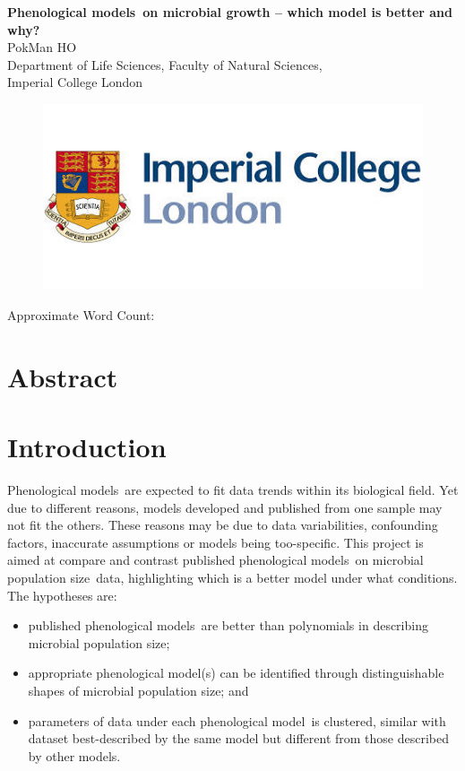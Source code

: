 \documentclass[a4paper, 11pt]{article}
\title{\ReportTitle}
\author{\ReportAuthor\ (CID: 01786076)}
\date{}
\newcommand{\pml}{phenological model}
\newcommand{\pms}{phenological models}
\newcommand{\Pms}{Phenological models}
\newcommand{\ReportTitle}{\Pms\ on microbial growth -- which model is better and why?} %
\newcommand{\ReportAuthor}{PokMan HO}
\newcommand{\ReportAffil}{Department of Life Sciences, Faculty of Natural Sciences,\\Imperial College London}
\newcommand{\pop}{population size}
\begin{document}
	\begin{center}
		\Huge\textbf{\ReportTitle}\\
		\LARGE\ReportAuthor\\
		\Large\ReportAffil
	\end{center}
	\begin{figure}[h]
		\centering\includegraphics[width=\linewidth]{icl.jpg}
	\end{figure}
	\begin{flushright}
		\Large Approximate Word Count: %
	\end{flushright}
	\clearpage
	
	\maketitle
	\section*{Abstract}
	
	
	\section*{Introduction}
	\Pms\ are expected to fit data trends within its biological field.  Yet due to different reasons, models developed and published from one sample may not fit the others.  These reasons may be due to data variabilities, confounding factors, inaccurate assumptions or models being too-specific.  This project is aimed at compare and contrast published \pms\ on microbial \pop\ data, highlighting which is a better model under what conditions.  The hypotheses are:
	\begin{itemize}
		\item published \pms\ are better than polynomials in describing microbial \pop;
		\item appropriate \pml(s) can be identified through distinguishable shapes of microbial \pop; and
		\item parameters of data under each \pml\ is clustered, similar with dataset best-described by the same model but different from those described by other models.
	\end{itemize}
	
\end{document}
